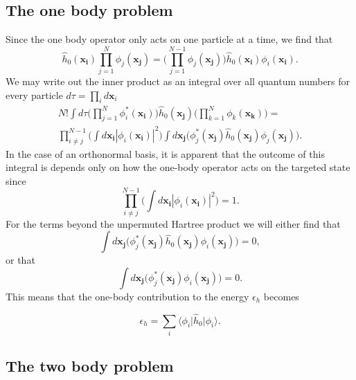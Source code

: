 \subsection{The one body problem}

Since the one body operator only acts on one particle at a time, we find that
\begin{equation}
\hat{h}_0(\mathbf{x_i})\prod _{j=1}^N \phi _j (\mathbf{x_j}) = \Bigg( \prod _{j=1}^{N-1} \phi _j(\mathbf{x_j}) \Bigg) \hat{h}_0(\mathbf{x_i}) \phi _i(\mathbf{x_i}).
 \label{eqn:onebody_2}
\end{equation}
We may write out the inner product as an integral over all quantum numbers for every particle $d\tau = \prod_i d\mathbf{x}_i$
\begin{multline}
N! \int d\tau \Bigg( \prod _{j=1}^N \phi _i^{*} (\mathbf{x_i}) \Bigg) \hat{h}_0(\mathbf{x_j}) \Bigg( \prod _{k=1}^N \phi _k (\mathbf{x_k}) \Bigg) = \\
\prod _{i\neq j}^{N-1} \Big( \int d\mathbf{x_i} |\phi _i (\mathbf{x_i}) | ^2 \Big) \int d\mathbf{x_j} \big( \phi _j^{*}(\mathbf{x_j}) \hat{h}_0(\mathbf{x_j}) \phi _j(\mathbf{x_j}) \big).
\label{eqn:onebody_inner}
\end{multline}
In the case of an orthonormal basis, it is apparent that the outcome of this integral is 
depends only on how the one-body operator acts on the targeted state since
\begin{equation}
\prod _{i\neq j}^{N-1} \Big( \int d\mathbf{x_i} |\phi _i (\mathbf{x_i}) | ^2 \Big) = 1. 
\label{eqn:orthogonal_onebody}
\end{equation}
For the terms beyond the unpermuted Hartree product we will either find that
\begin{equation}
  \int d\mathbf{x_j} \big( \phi _j^{*}(\mathbf{x_j})\hat{h}_0(\mathbf{x_j})\phi _i(\mathbf{x_j})\big) = 0,
\end{equation}
or that
\begin{equation}
  \int d\mathbf{x_j} \big( \phi _j^{*}(\mathbf{x_j})\phi _i(\mathbf{x_j})\big) = 0.
\end{equation}
This means that the one-body contribution to the energy $\epsilon_h$ becomes

\begin{equation}
\epsilon_{h}  = \sum_i \langle \phi_i \vert \hat{h}_0 \vert \phi_i \rangle.
\label{eqn:onebody_energy}
\end{equation}

\subsection{The two body problem}

